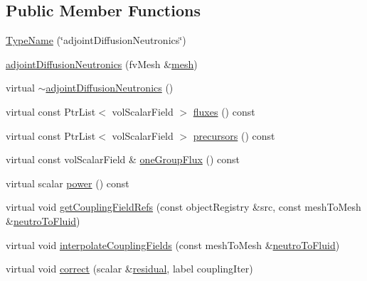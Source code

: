 \subsection*{Public Member Functions}
\begin{DoxyCompactItemize}
\item 
\hyperlink{classFoam_1_1adjointDiffusionNeutronics_a1baa47feaaa48d74a0e51c36f5e71511}{Type\+Name} (\char`\"{}adjoint\+Diffusion\+Neutronics\char`\"{})
\item 
\hyperlink{classFoam_1_1adjointDiffusionNeutronics_a3f907bc565975a4cb1f012a9842fe8b0}{adjoint\+Diffusion\+Neutronics} (fv\+Mesh \&\hyperlink{classFoam_1_1neutronics_a8bb1e58291d2d2b653e024a4f4bffe38}{mesh})
\item 
virtual \hyperlink{classFoam_1_1adjointDiffusionNeutronics_a944d4acf957b1639721c576966a09333}{$\sim$adjoint\+Diffusion\+Neutronics} ()
\item 
virtual const Ptr\+List$<$ vol\+Scalar\+Field $>$ \hyperlink{classFoam_1_1adjointDiffusionNeutronics_abf64af4a1378deee4038292ef2bed74e}{fluxes} () const
\item 
virtual const Ptr\+List$<$ vol\+Scalar\+Field $>$ \hyperlink{classFoam_1_1adjointDiffusionNeutronics_adff280398fa801b37b673a30623f5afe}{precursors} () const
\item 
virtual const vol\+Scalar\+Field \& \hyperlink{classFoam_1_1adjointDiffusionNeutronics_a67faa978ebf3e97a9df21f1e37a68a8d}{one\+Group\+Flux} () const
\item 
virtual scalar \hyperlink{classFoam_1_1adjointDiffusionNeutronics_a96a4e39548be52ca563c1e5b7dd885b8}{power} () const
\item 
virtual void \hyperlink{classFoam_1_1adjointDiffusionNeutronics_a92e79ddc2a3b75672fd0abdb39c642a5}{get\+Coupling\+Field\+Refs} (const object\+Registry \&src, const mesh\+To\+Mesh \&\hyperlink{createMeshInterpolators_8H_aa7d8334dd5ea1819a83900ea05ace02f}{neutro\+To\+Fluid})
\item 
virtual void \hyperlink{classFoam_1_1adjointDiffusionNeutronics_a8b317ca01efa1efb32264be43472ec10}{interpolate\+Coupling\+Fields} (const mesh\+To\+Mesh \&\hyperlink{createMeshInterpolators_8H_aa7d8334dd5ea1819a83900ea05ace02f}{neutro\+To\+Fluid})
\item 
virtual void \hyperlink{classFoam_1_1adjointDiffusionNeutronics_ae019379f6473a5b4fa9fcf696c9a4235}{correct} (scalar \&\hyperlink{solveThermalMechanics_8H_a840cf6bbf9aacf15bd364b478394c3a7}{residual}, label coupling\+Iter)
\end{DoxyCompactItemize}
